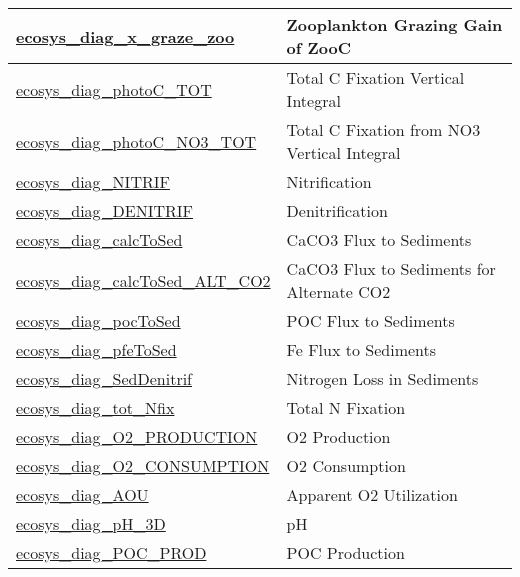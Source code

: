 {\begin{center}
\begin{longtable}{| p{2.0in} | p{4.0in} |}
    \hline
    \hyperref[subsec:var_sec_forcing_ecosys_diag_x_graze_zoo]{ecosys\_diag\_x\_graze\_zoo} & Zooplankton Grazing Gain of ZooC \\
    \hline
    \hyperref[subsec:var_sec_forcing_ecosys_diag_photoC_TOT]{ecosys\_diag\_photoC\_TOT} & Total C Fixation Vertical Integral \\
    \hline
    \hyperref[subsec:var_sec_forcing_ecosys_diag_photoC_NO3_TOT]{ecosys\_diag\_photoC\_NO3\_\-TOT} & Total C Fixation from NO3 Vertical Integral \\
    \hline
    \hyperref[subsec:var_sec_forcing_ecosys_diag_NITRIF]{ecosys\_diag\_NITRIF} & Nitrification \\
    \hline
    \hyperref[subsec:var_sec_forcing_ecosys_diag_DENITRIF]{ecosys\_diag\_DENITRIF} & Denitrification \\
    \hline
    \hyperref[subsec:var_sec_forcing_ecosys_diag_calcToSed]{ecosys\_diag\_calcToSed} & CaCO3 Flux to Sediments \\
    \hline
    \hyperref[subsec:var_sec_forcing_ecosys_diag_calcToSed_ALT_CO2]{ecosys\_diag\_calcToSed\_ALT\_\-CO2} & CaCO3 Flux to Sediments for Alternate CO2 \\
    \hline
    \hyperref[subsec:var_sec_forcing_ecosys_diag_pocToSed]{ecosys\_diag\_pocToSed} & POC Flux to Sediments \\
    \hline
    \hyperref[subsec:var_sec_forcing_ecosys_diag_pfeToSed]{ecosys\_diag\_pfeToSed} & Fe Flux to Sediments \\
    \hline
    \hyperref[subsec:var_sec_forcing_ecosys_diag_SedDenitrif]{ecosys\_diag\_SedDenitrif} & Nitrogen Loss in Sediments \\
    \hline
    \hyperref[subsec:var_sec_forcing_ecosys_diag_tot_Nfix]{ecosys\_diag\_tot\_Nfix} & Total N Fixation \\
    \hline
    \hyperref[subsec:var_sec_forcing_ecosys_diag_O2_PRODUCTION]{ecosys\_diag\_O2\_\-PRODUCTION} & O2 Production \\
    \hline
    \hyperref[subsec:var_sec_forcing_ecosys_diag_O2_CONSUMPTION]{ecosys\_diag\_O2\_\-CONSUMPTION} & O2 Consumption \\
    \hline
    \hyperref[subsec:var_sec_forcing_ecosys_diag_AOU]{ecosys\_diag\_AOU} & Apparent O2 Utilization \\
    \hline
    \hyperref[subsec:var_sec_forcing_ecosys_diag_pH_3D]{ecosys\_diag\_pH\_3D} & pH \\
    \hline
    \hyperref[subsec:var_sec_forcing_ecosys_diag_POC_PROD]{ecosys\_diag\_POC\_PROD} & POC Production \\

\end{longtable}
\end{center}}
